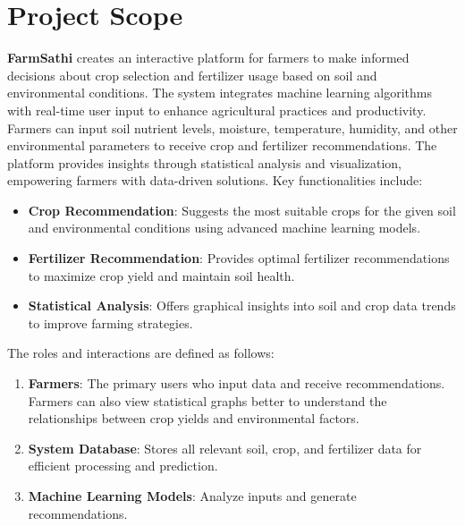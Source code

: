 \documentclass{scrreprt}
\begin{document}
\section{Project Scope}  
\textbf{FarmSathi} creates an interactive platform for farmers to make informed decisions about crop selection and fertilizer usage based on soil and environmental conditions. The system integrates machine learning algorithms with real-time user input to enhance agricultural practices and productivity.  
\newline
\newline
Farmers can input soil nutrient levels, moisture, temperature, humidity, and other environmental parameters to receive crop and fertilizer recommendations. The platform provides insights through statistical analysis and visualization, empowering farmers with data-driven solutions.  
\newline
Key functionalities include:  
\begin{itemize}
    \item \textbf{Crop Recommendation}: Suggests the most suitable crops for the given soil and environmental conditions using advanced machine learning models.
    \item \textbf{Fertilizer Recommendation}: Provides optimal fertilizer recommendations to maximize crop yield and maintain soil health.
    \item \textbf{Statistical Analysis}: Offers graphical insights into soil and crop data trends to improve farming strategies.
\end{itemize}
\newline
The roles and interactions are defined as follows:  
\begin{enumerate}
    \item \textbf{Farmers}: The primary users who input data and receive recommendations. Farmers can also view statistical graphs better to understand the relationships between crop yields and environmental factors.
    \item \textbf{System Database}: Stores all relevant soil, crop, and fertilizer data for efficient processing and prediction.
    \item \textbf{Machine Learning Models}: Analyze inputs and generate recommendations.
\end{enumerate}

\end{document}
